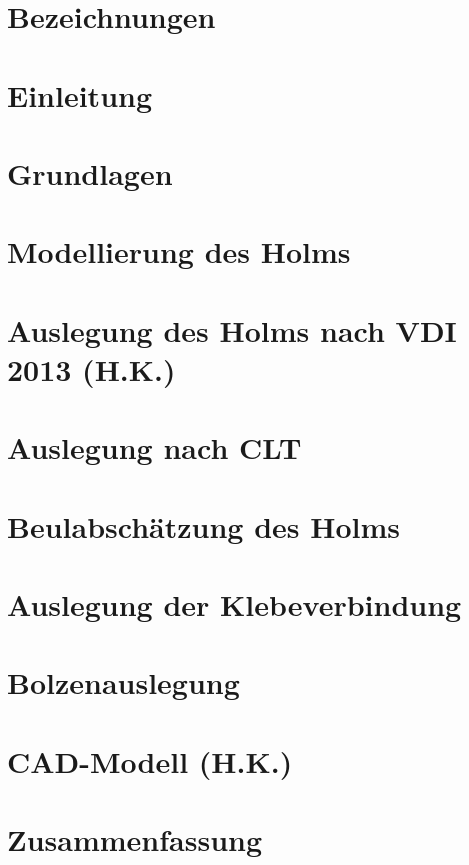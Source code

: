 \documentclass[a4paper,twoside,11pt]{article}
\begin{document}

\newpage

\newpage

\newpage
\tableofcontents
\newpage
\section{Bezeichnungen}

\newpage
\section{Einleitung}

\newpage
\section{Grundlagen}

\newpage
\section{Modellierung des Holms}

\newpage
\section{Auslegung des Holms nach VDI 2013 (H.K.)}
\label{VDI2013}

\newpage
\section{Auslegung nach CLT}

\newpage
\section{Beulabschätzung des Holms}

\newpage
\section{Auslegung der Klebeverbindung}

\newpage
\section{Bolzenauslegung}

\newpage
\section{CAD-Modell (H.K.)}

\newpage
\section{Zusammenfassung}

\newpage
\end{document}
